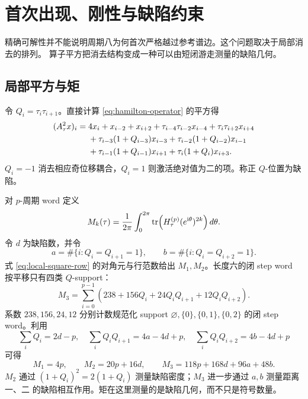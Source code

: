 \section{首次出现、刚性与缺陷约束}
\label{sec:first-rigidity}

精确可解性并不能说明周期八为何首次严格越过参考谱边。这个问题取决于局部消去的排列。
算子平方把消去结构变成一种可以由短闭游走测量的缺陷几何。

\subsection{局部平方与矩}

令 $Q_i=\tau_i\tau_{i+1}$。直接计算 \eqref{eq:hamilton-operator} 的平方得
\begin{align}
(A_\tau^2x)_i={}&4x_i+x_{i-2}+x_{i+2}
 +\tau_{i-4}\tau_{i-2}x_{i-4}+\tau_i\tau_{i+2}x_{i+4}\notag\\
&+\tau_{i-3}(1+Q_{i-3})x_{i-3}
 +\tau_{i-2}(1+Q_{i-2})x_{i-1}\notag\\
&+\tau_{i-1}(1+Q_{i-1})x_{i+1}
 +\tau_i(1+Q_i)x_{i+3}.
\label{eq:local-square-row}
\end{align}
$Q_i=-1$ 消去相应奇位移耦合，$Q_i=1$ 则激活绝对值为二的项。称正 $Q$-位置为缺陷。

对 $p$-周期 word 定义
\begin{equation}
 M_k(\tau)=\frac1{2\pi}\int_0^{2\pi}
 \operatorname{tr}\!\left(H_\tau^{(p)}(e^{\mathrm i\theta})^{2k}\right)d\theta.
 \label{eq:phase-averaged-moments}
\end{equation}
令 $d$ 为缺陷数，并令
\begin{equation}
 a=\#\{i:Q_i=Q_{i+1}=1\},\qquad
 b=\#\{i:Q_i=Q_{i+2}=1\}.
 \label{eq:defect-statistics}
\end{equation}
式 \eqref{eq:local-square-row} 的对角元与行范数给出 $M_1,M_2$。长度六的闭 step word
按平移只有四类 $Q$-support：
\begin{equation}
 M_3=\sum_{i=0}^{p-1}
 \left(238+156Q_i+24Q_iQ_{i+1}+12Q_iQ_{i+2}\right).
 \label{eq:m3-q-expansion}
\end{equation}
系数 $238,156,24,12$ 分别计数规范化 support
$\varnothing,\{0\},\{0,1\},\{0,2\}$ 的闭 step word。利用
\[
\sum_iQ_i=2d-p,\quad
\sum_iQ_iQ_{i+1}=4a-4d+p,\quad
\sum_iQ_iQ_{i+2}=4b-4d+p
\]
可得
\begin{equation}
 M_1=4p,\qquad M_2=20p+16d,\qquad
 M_3=118p+168d+96a+48b.
 \label{eq:first-three-moments}
\end{equation}
$M_2$ 通过 $(1+Q_i)^2=2(1+Q_i)$ 测量缺陷密度；$M_3$ 进一步通过 $a,b$ 测量距离一、二
的缺陷相互作用。矩在这里测量的是缺陷几何，而不只是符号数量。


